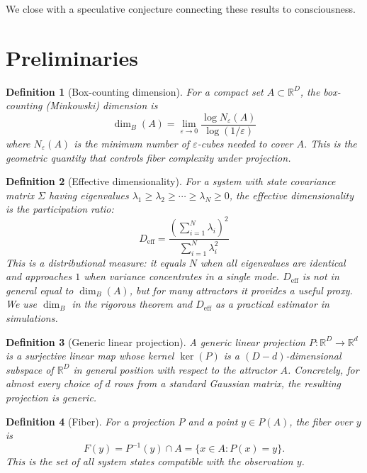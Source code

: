 \documentclass[12pt,a4paper]{article}
\newtheorem{definition}{Definition}
\begin{document}
We close with a speculative conjecture connecting these results to consciousness.

\section{Preliminaries}
\label{sec:prelim}

\begin{definition}[Box-counting dimension]
For a compact set $A \subset \mathbb{R}^D$, the \emph{box-counting (Minkowski) dimension} is
\begin{equation}
\dim_B(A) = \lim_{\varepsilon \to 0} \frac{\log N_\varepsilon(A)}{\log(1/\varepsilon)}
\end{equation}
where $N_\varepsilon(A)$ is the minimum number of $\varepsilon$-cubes needed to cover $A$.
This is the geometric quantity that controls fiber complexity under projection.
\end{definition}

\begin{definition}[Effective dimensionality]
For a system with state covariance matrix $\Sigma$ having eigenvalues $\lambda_1 \geq \lambda_2 \geq \cdots \geq \lambda_N \geq 0$, the \emph{effective dimensionality} is the participation ratio:
\begin{equation}
D_{\mathrm{eff}} = \frac{\left(\sum_{i=1}^{N} \lambda_i\right)^2}{\sum_{i=1}^{N} \lambda_i^2}
\label{eq:deff}
\end{equation}
This is a distributional measure: it equals $N$ when all eigenvalues are identical and approaches $1$ when variance concentrates in a single mode.
$D_{\mathrm{eff}}$ is not in general equal to $\dim_B(A)$, but for many attractors it provides a useful proxy.
We use $\dim_B$ in the rigorous theorem and $D_{\mathrm{eff}}$ as a practical estimator in simulations.
\end{definition}

\begin{definition}[Generic linear projection]
A \emph{generic linear projection} $P: \mathbb{R}^D \to \mathbb{R}^d$ is a surjective linear map whose kernel $\ker(P)$ is a $(D-d)$-dimensional subspace of $\mathbb{R}^D$ in general position with respect to the attractor $A$.
Concretely, for almost every choice of $d$ rows from a standard Gaussian matrix, the resulting projection is generic.
\end{definition}

\begin{definition}[Fiber]
For a projection $P$ and a point $y \in P(A)$, the \emph{fiber} over $y$ is
\begin{equation}
F(y) = P^{-1}(y) \cap A = \{x \in A : P(x) = y\}.
\end{equation}
This is the set of all system states compatible with the observation $y$.
\end{definition}
\end{document}
